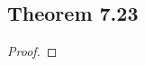 \documentclass[../../main.tex]{subfiles}
\begin{document}
\subsection{Theorem 7.23}
\begin{wts}

\end{wts}
\begin{proof}

\end{proof}
\end{document}
